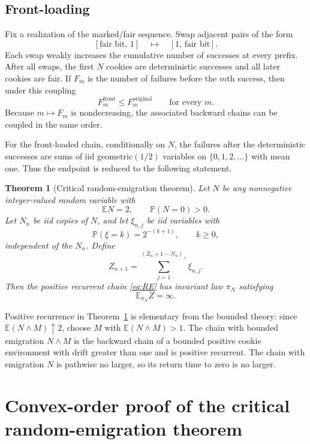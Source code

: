 \documentclass[11pt]{article}
\newtheorem{theorem}{Theorem}[section]
\newcommand{\E}{\mathbb E}
\newcommand{\Pp}{\mathbb P}
\begin{document}
\subsection{Front-loading}

Fix a realization of the marked/fair sequence.  Swap adjacent pairs of the form
\[
 [\text{fair bit},\,1]\quad\longmapsto\quad[1,\,\text{fair bit}].
\]
Each swap weakly increases the cumulative number of successes at every prefix.  After all swaps, the first $N$ cookies are deterministic successes and all later cookies are fair.  If $F_m$ is the number of failures before the $m$th success, then under this coupling
\begin{equation}\label{eq:front}
 F_m^{\mathrm{front}}\le F_m^{\mathrm{original}}
 \qquad\text{for every }m.
\end{equation}
Because $m\mapsto F_m$ is nondecreasing, the associated backward chains can be coupled in the same order.

For the front-loaded chain, conditionally on $N$, the failures after the deterministic successes are sums of iid geometric$(1/2)$ variables on $\{0,1,2,\dots\}$ with mean one.  Thus the endpoint is reduced to the following statement.

\begin{theorem}[Critical random-emigration theorem]\label{thm:RE}
Let $N$ be any nonnegative integer-valued random variable with
\[
 \E N=2,\qquad \Pp(N=0)>0.
\]
Let $N_n$ be iid copies of $N$, and let $\xi_{n,j}$ be iid variables with
\[
 \Pp(\xi=k)=2^{-(k+1)},\qquad k\ge0,
\]
independent of the $N_n$.  Define
\begin{equation}\label{eq:RE}
 Z_{n+1}=\sum_{j=1}^{(Z_n+1-N_n)_+}\xi_{n,j}.
\end{equation}
Then the positive recurrent chain \eqref{eq:RE} has invariant law $\pi_N$ satisfying
\[
 \E_{\pi_N}Z=\infty.
\]
\end{theorem}

Positive recurrence in Theorem~\ref{thm:RE} is elementary from the bounded theory: since $\E(N\wedge M)\uparrow2$, choose $M$ with $\E(N\wedge M)>1$.  The chain with bounded emigration $N\wedge M$ is the backward chain of a bounded positive cookie environment with drift greater than one and is positive recurrent.  The chain with emigration $N$ is pathwise no larger, so its return time to zero is no larger.

\section{Convex-order proof of the critical random-emigration theorem}
\end{document}
